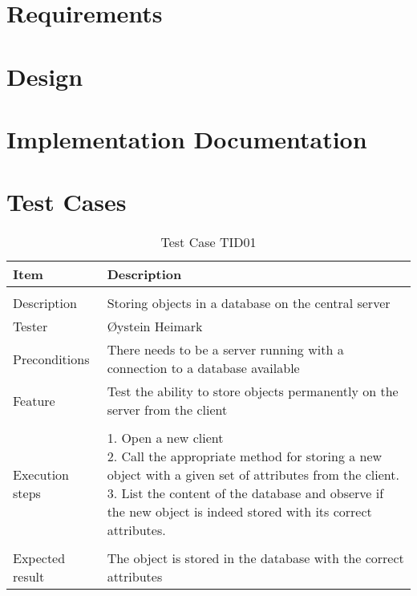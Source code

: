 
\appendix

\clearpage

\setcounter{page}{1}

\chapter{Requirements}\label{app:req}
\chapter{Design}\label{app:design}
\chapter{Implementation Documentation}\label{app:impl}

\chapter{Test Cases}\label{app:test}

\begin{table}[H]
\caption{Test Case TID01}
\centering
\begin{tabular}{ l p{13cm} }
\hline
 Item            & Description                                                              \\
\hline \\ [-2.0ex]
 Description     & Storing objects in a database on the central server \\
 Tester          & Øystein Heimark                  \\
 Preconditions   & There needs to be a server running with a connection to a database available \\
 Feature         & Test the ability to store objects permanently on the server from the client  \vspace{3pt}   \\
\hline \\ [-1.5ex]
 Execution steps & \pbox{13cm}{1. Open a new client \\ 2. Call the appropriate method for storing a new object with a given set of attributes from the client. \\ 3. List the content of the database and observe if the new object is indeed stored with its correct attributes. } \vspace{3pt} \\
\hline \\ [-1.5ex]
 Expected result & The object is stored in the database with the correct attributes \\
\hline
\end{tabular}
\label{table:testcasetid01}
\end{table}
